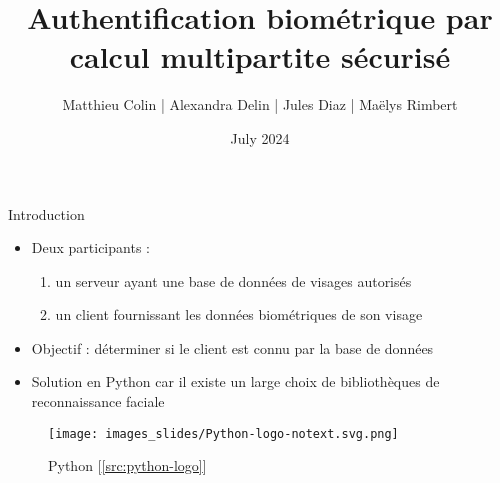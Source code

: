 \documentclass[9pt]{beamer}
\date[\displaydate{date}]{}
\title[LT]{Authentification biométrique par calcul multipartite sécurisé}
\author{Matthieu Colin | Alexandra Delin | Jules Diaz | Maëlys Rimbert}
\date{July 2024}
\institute{EPITA}
\begin{document}
\begin{frame}
	\titlepage
\end{frame}

\begin{frame}{Introduction}
    \begin{itemize}
        \item Deux participants :
        \begin{enumerate}
            \item un serveur ayant une base de données de visages autorisés
            \item un client fournissant les données biométriques de son visage
        \end{enumerate}
        \item Objectif : déterminer si le client est connu par la base de données
        \item Solution en Python car il existe un large choix de bibliothèques de reconnaissance faciale
    \end{itemize}
    \begin{figure}
        \centering
        \texttt{[image: images\_slides/Python-logo-notext.svg.png]}
        \caption{Python [\ref{src:python-logo}]}
        \label{fig:enter-label}
    \end{figure}
\end{frame}
\end{document}
